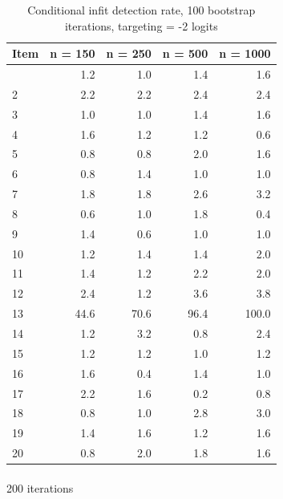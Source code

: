 \documentclass[
  letterpaper,
  DIV=11,
  numbers=noendperiod]{scrartcl}
\makeatletter
\let\oldparagraph\paragraph
\renewcommand{\paragraph}{
    \@ifstar
      \xxxParagraphStar
      \xxxParagraphNoStar
  }
\newcommand{\xxxParagraphStar}[1]{\oldparagraph*{#1}\mbox{}}
\newcommand{\xxxParagraphNoStar}[1]{\oldparagraph{#1}\mbox{}}
\makeatother
\begin{document}
\begin{longtable}[]{@{}lrrrr@{}}

\caption{\label{tbl-ifbresults1002}Conditional infit detection rate, 100
bootstrap iterations, targeting = -2 logits}

\tabularnewline

\toprule\noalign{}
Item & n = 150 & n = 250 & n = 500 & n = 1000 \\
\midrule\noalign{}
\endhead
\bottomrule\noalign{}
\endlastfoot
1 & 1.2 & 1.0 & 1.4 & 1.6 \\
2 & 2.2 & 2.2 & 2.4 & 2.4 \\
3 & 1.0 & 1.0 & 1.4 & 1.6 \\
4 & 1.6 & 1.2 & 1.2 & 0.6 \\
5 & 0.8 & 0.8 & 2.0 & 1.6 \\
6 & 0.8 & 1.4 & 1.0 & 1.0 \\
7 & 1.8 & 1.8 & 2.6 & 3.2 \\
8 & 0.6 & 1.0 & 1.8 & 0.4 \\
9 & 1.4 & 0.6 & 1.0 & 1.0 \\
10 & 1.2 & 1.4 & 1.4 & 2.0 \\
11 & 1.4 & 1.2 & 2.2 & 2.0 \\
12 & 2.4 & 1.2 & 3.6 & 3.8 \\
13 & 44.6 & 70.6 & 96.4 & 100.0 \\
14 & 1.2 & 3.2 & 0.8 & 2.4 \\
15 & 1.2 & 1.2 & 1.0 & 1.2 \\
16 & 1.6 & 0.4 & 1.4 & 1.0 \\
17 & 2.2 & 1.6 & 0.2 & 0.8 \\
18 & 0.8 & 1.0 & 2.8 & 3.0 \\
19 & 1.4 & 1.6 & 1.2 & 1.6 \\
20 & 0.8 & 2.0 & 1.8 & 1.6 \\

\end{longtable}

\paragraph{200 iterations}\label{iterations-1}
\end{document}
